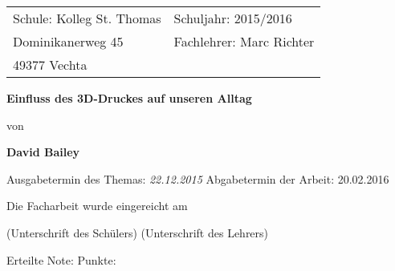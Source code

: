 \begin{titlepage}

\begin{tabular}{@{}p{3.8in}l}
Schule: Kolleg St. Thomas       & Schuljahr: 2015/2016\\
Dominikanerweg 45   & Fachlehrer: Marc Richter\\
49377 Vechta           & \\
\end{tabular}

\vspace{7.5cm}

\centering
{\Large\bf Einfluss des 3D-Druckes auf unseren Alltag \par\vspace{1cm}}
von \par\vspace{1cm}
{\bf David Bailey}

\vfill

Ausgabetermin des Themas: \emph{22.12.2015}
\hfill Abgabetermin der Arbeit: 20.02.2016

\vspace{0.8cm}

Die Facharbeit wurde eingereicht am  \underline{\hspace{8.7cm}}

\vspace{0.8cm}

\raggedright
\underline{\hspace{6.8cm}} \hfill
\underline{\hspace{6.8cm}}

\raggedright
(Unterschrift des Schülers)
\hspace{3.5cm} (Unterschrift des Lehrers)

\vspace{0.8cm}

\raggedright
Erteilte Note:\underline{\hspace{5cm}}
\hfill Punkte:\underline{\hspace{5cm}}

\end{titlepage}

\setcounter{page}{2}
